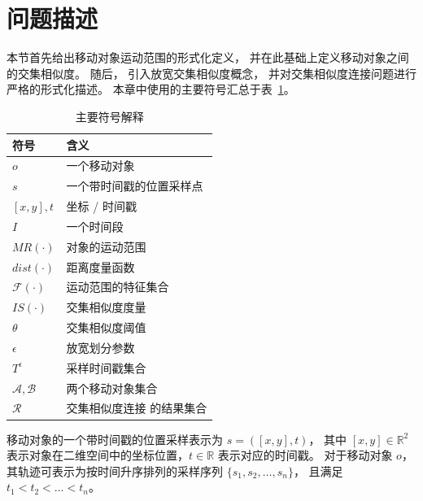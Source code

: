 \section{问题描述}
\label{join_sec:statement}
本节首先给出移动对象运动范围的形式化定义， 并在此基础上定义移动对象之间的交集相似度。 随后， 引入放宽交集相似度概念， 并对交集相似度连接问题进行严格的形式化描述。 本章中使用的主要符号汇总于表~\ref{tab:notation}。
\begin{table}[!ht]
    \caption{主要符号解释}\label{tab:notation}
    \begin{tabular}{ll}
        \toprule
		\bfseries 符号 & \bfseries 含义 \\
        \midrule
        $o$ & 一个移动对象  \\
        $s$ & 一个带时间戳的位置采样点  \\
        $[x,y],t$ & 坐标 / 时间戳  \\
        $I$ & 一个时间段  \\
        $MR(\cdot)$ & 对象的运动范围 \\
        $dist(\cdot)$ & 距离度量函数 \\
        $\mathcal{F}(\cdot)$ & 运动范围的特征集合 \\
        $IS(\cdot)$ & 交集相似度度量\\
        $\theta$ & 交集相似度阈值 \\
        $\epsilon$ & 放宽划分参数 \\
        $T^\epsilon$  & 采样时间戳集合 \\
        $\mathcal{A}, \mathcal{B}$ & 两个移动对象集合  \\
        $\mathcal{R}$ & 交集相似度连接 的结果集合 \\
        \bottomrule
    \end{tabular}

\end{table}




\begin{definition}[带时间戳的位置采样]
移动对象的一个带时间戳的位置采样表示为 $s = ([x,y], t)$， 其中 $[x,y] \in \mathbb{R}^2$ 表示对象在二维空间中的坐标位置，$t \in \mathbb{R}$ 表示对应的时间戳。 对于移动对象 $o$， 其轨迹可表示为按时间升序排列的采样序列 $\{s_1, s_2, \dots, s_n\}$， 且满足 $t_1 < t_2 < \dots < t_n$。
\end{definition}

